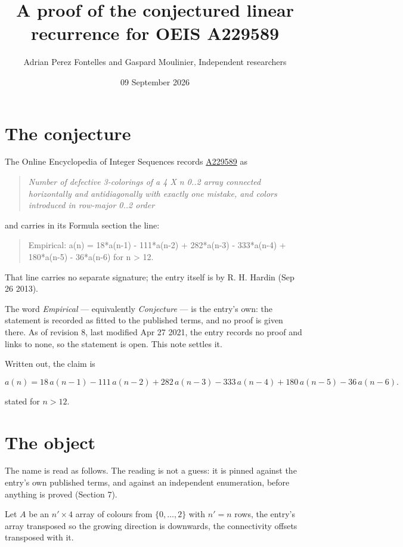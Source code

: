 \documentclass[11pt]{article}
\title{A proof of the conjectured linear recurrence for OEIS A229589}
\author{Adrian Perez Fontelles and Gaspard Moulinier, Independent researchers}
\date{09 September 2026}
\theoremstyle{definition}
\begin{document}
\maketitle
\section{The conjecture}

The Online Encyclopedia of Integer Sequences records \href{https://oeis.org/A229589}{A229589} as

\begin{quote}\itshape Number of defective 3-colorings of a 4 X n 0..2 array connected horizontally and antidiagonally with exactly one mistake, and colors introduced in row-major 0..2 order\end{quote}

and carries in its Formula section the line:

\begin{quote}\ttfamily Empirical: a(n) = 18*a(n-1) - 111*a(n-2) + 282*a(n-3) - 333*a(n-4) + 180*a(n-5) - 36*a(n-6) for n > 12.\end{quote}

That line carries no separate signature; the entry itself is by R. H. Hardin (Sep 26 2013).

The word {\itshape Empirical} --- equivalently {\itshape Conjecture} --- is the entry's own: the statement is recorded as fitted to the published terms, and no proof is given there. As of revision 8, last modified Apr 27 2021, the entry records no proof and links to none, so the statement is open. This note settles it.

Written out, the claim is

\[a(n) = 18\,a(n-1) - 111\,a(n-2) + 282\,a(n-3) - 333\,a(n-4) + 180\,a(n-5) - 36\,a(n-6).\]

stated for $n > 12$.

\section{The object}

The name is read as follows. The reading is not a guess: it is pinned against the entry's own published terms, and against an independent enumeration, before anything is proved (Section 7).

Let $A$ be an $n' \times 4$ array of colours from $\{0,\dots,2\}$ with $n' = n$ rows, the entry's array transposed so the growing direction is downwards, the connectivity offsets transposed with it.
\end{document}
